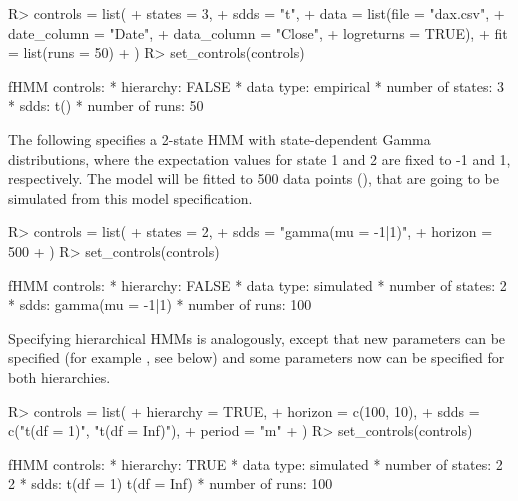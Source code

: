 \documentclass[article]{jss}
\begin{document}
%
\begin{Schunk}
\begin{Sinput}
R> controls = list(
+    states = 3,
+    sdds   = "t",
+    data   = list(file        = "dax.csv",
+                  date_column = "Date",
+                  data_column = "Close",
+                  logreturns  = TRUE),
+    fit    = list(runs        = 50)
+  )
R> set_controls(controls)
\end{Sinput}
\begin{Soutput}
fHMM controls:
* hierarchy: FALSE 
* data type: empirical 
* number of states: 3 
* sdds: t() 
* number of runs: 50  
\end{Soutput}
\end{Schunk}
%

The following specifies a 2-state HMM with state-dependent Gamma distributions, where the expectation values for state 1 and 2 are fixed to -1 and 1, respectively. The model will be fitted to 500 data points (), that are going to be simulated from this model specification.

%
\begin{Schunk}
\begin{Sinput}
R> controls = list(
+    states  = 2,
+    sdds    = "gamma(mu = -1|1)",
+    horizon = 500
+  )
R> set_controls(controls)
\end{Sinput}
\begin{Soutput}
fHMM controls:
* hierarchy: FALSE 
* data type: simulated 
* number of states: 2 
* sdds: gamma(mu = -1|1) 
* number of runs: 100  
\end{Soutput}
\end{Schunk}
%

Specifying hierarchical HMMs is analogously, except that new parameters can be specified (for example , see below) and some parameters now can be specified for both hierarchies.

%
\begin{Schunk}
\begin{Sinput}
R> controls = list(
+    hierarchy = TRUE,
+    horizon   = c(100, 10),
+    sdds      = c("t(df = 1)", "t(df = Inf)"),
+    period    = "m"
+  )
R> set_controls(controls)
\end{Sinput}
\begin{Soutput}
fHMM controls:
* hierarchy: TRUE 
* data type: simulated 
* number of states: 2 2 
* sdds: t(df = 1) t(df = Inf) 
* number of runs: 100  
\end{Soutput}
\end{Schunk}
%
\end{document}
